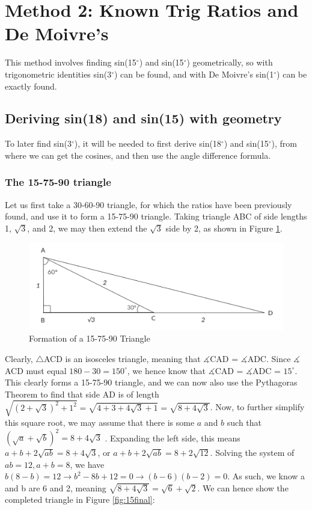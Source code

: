 \documentclass[12pt]{article}
\begin{document}
\section{Method 2: Known Trig Ratios and De Moivre's} 

This method involves finding sin(15$^{\circ}$) and sin(15$^{\circ}$) geometrically, so with trigonometric identities sin(3$^{\circ}$) can be found, and with De Moivre's sin(1$^{\circ}$) can be exactly found.

\subsection{Deriving sin(18) and sin(15) with geometry}
To later find sin(3$^{\circ}$), it will be needed to first derive sin(18$^{\circ}$) and sin(15$^{\circ}$), from where we can get the cosines, and then use the angle difference formula.
\subsubsection{The 15-75-90 triangle}
Let us first take a 30-60-90 triangle, for which the ratios have been previously found, and use it to form a 15-75-90 triangle. Taking triangle ABC of side lengths 1, $\sqrt{3}$, and 2, we may then extend the $\sqrt{3}$ side by 2, as shown in Figure \ref{fig:15first}.\\

\begin{figure}[h]
    \centering
    \includegraphics[width=0.8\linewidth]{15-75-90.png}
    \caption{Formation of a 15-75-90 Triangle}
    \label{fig:15first}
\end{figure}

Clearly, $\triangle$ACD is an isosceles triangle, meaning that $\measuredangle$CAD = $\measuredangle$ADC. Since $\measuredangle$ACD must equal $180-30 = 150^{\circ}$, we hence know that $\measuredangle$CAD = $\measuredangle$ADC = $15^{\circ}$. This clearly forms a 15-75-90 triangle, and we can now also use the Pythagoras Theorem to find that side AD is of length $\sqrt{(2+\sqrt{3})^2+1^2} = \sqrt{4+3+4\sqrt{3}+1} = \sqrt{8+4\sqrt{3}}$. Now, to further simplify this square root, we may assume that there is some $a$ and $b$ such that $(\sqrt{a}+\sqrt{b})^2=8+4\sqrt{3}$ . Expanding the left side, this means $a+b+2\sqrt{ab}=8+4\sqrt{3}$, or $a+b+2\sqrt{ab}=8+2\sqrt{12}$. Solving the system of $ab=12, a+b=8$, we have $b(8-b)=12 \rightarrow b^2 - 8b + 12 = 0 \rightarrow (b-6)(b-2) = 0$. As such, we know a and b are 6 and 2, meaning $\sqrt{8+4\sqrt{3}} = \sqrt{6}+\sqrt{2}$. We can hence show the completed triangle in Figure \ref{fig:15final}:
\end{document}
